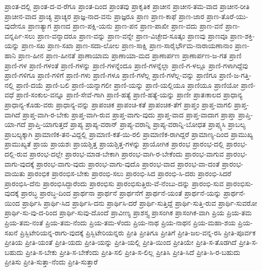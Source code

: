 {ಪ್ರಾಂತ-ದಲ್ಲಿ
ಪ್ರಾಂತ-ದ-ವ-ರೆಗೂ
ಪ್ರಾಂತ-ದಿಂದ
ಪ್ರಾಂತವು
ಪ್ರಾಕೃತಿಕ
ಪ್ರಾಚೀನ
ಪ್ರಾಚೀನ-ತಮ-ವಾದ
ಪ್ರಾಚೀನ-ರೀತಿ
ಪ್ರಾಚೀನ-ವಾದ
ಪ್ರಾಚ್ಯ
ಪ್ರಾಚ್ಯರ
ಪ್ರಾಜ್ಞ-ನಾದ-ವನು
ಪ್ರಾಜ್ಞರೂ
ಪ್ರಾಣ
ಪ್ರಾಣ-ಕಾಫೆ
ಪ್ರಾಣ-ಜಾರ
ಪ್ರಾಣ-ತೊರೆ-ಯು-ವುದೇನೂ
ಪ್ರಾಣತ್ಯಾಗ
ಪ್ರಾಣದ
ಪ್ರಾಣ-ಪಕ್ಷಿ-ಯನು
ಪ್ರಾಣ-ಪನ
ಪ್ರಾಣ-ಪಾಖೀ
ಪ್ರಾಣ-ವದು
ಪ್ರಾಣ-ವನೆ
ಪ್ರಾಣ-ವನ್ನರ್ಪಿ-ಸಲು
ಪ್ರಾಣ-ವನ್ನಾದರೂ
ಪ್ರಾಣ-ವನ್ನು
ಪ್ರಾಣ-ವನ್ನೇ
ಪ್ರಾಣ-ವಿಚ್ಛೇದ-ಸೂತ್ಕಂ
ಪ್ರಾಣವು
ಪ್ರಾಣವೂ
ಪ್ರಾಣ-ಶಕ್ತಿ-ಯನ್ನು
ಪ್ರಾಣ-ಸಖ
ಪ್ರಾಣ-ಸಖಾ
ಪ್ರಾಣ-ಸದಾ-ಲೋಲ
ಪ್ರಾಣ-ಸಾಕ್ಷಿ
ಪ್ರಾಣ-ಸಾರೈರ್ಭೌಮ-ನಾರಾಯಣಾನಾಂ
ಪ್ರಾಣ-ಹಾನಿ
ಪ್ರಾಣ-ಹೀನ
ಪ್ರಾಣ-ಹೀನತೆ
ಪ್ರಾಣಾಯಾಮ
ಪ್ರಾಣಾಯಾ-ಮದ
ಪ್ರಾಣಾರ್ಪಣ
ಪ್ರಾಣಾರ್ಪಣ-ಜ-ಗತ
ಪ್ರಾಣಿ
ಪ್ರಾಣಿ-ಗಳ
ಪ್ರಾಣಿ-ಗಳಂತೆ
ಪ್ರಾಣಿ-ಗಳನ್ನು
ಪ್ರಾಣಿ-ಗಳನ್ನೆಂದೂ
ಪ್ರಾಣಿ-ಗಳನ್ನೆಲ್ಲಾ
ಪ್ರಾಣಿ-ಗ-ಳಲ್ಲೂ
ಪ್ರಾಣಿ-ಗಳಾಗಿದ್ದೆವು
ಪ್ರಾಣಿ-ಗಳಿಗೂ
ಪ್ರಾಣಿ-ಗಳಿಗೆ
ಪ್ರಾಣಿ-ಗಳು
ಪ್ರಾಣಿ-ಗಳೂ
ಪ್ರಾಣಿ-ಗಳೆಲ್ಲ
ಪ್ರಾಣಿ-ಗಳೆಲ್ಲ-ವನ್ನು
ಪ್ರಾಣಿಗೂ
ಪ್ರಾಣಿ-ಜ-ಗತ್ತಿ-ನಲ್ಲಿ
ಪ್ರಾಣಿ-ದಯೆ
ಪ್ರಾಣಿ-ಬಲಿ
ಪ್ರಾಣಿ-ಯನ್ನಾಗಲೀ
ಪ್ರಾಣಿ-ಯನ್ನು
ಪ್ರಾಣಿ-ಯಲ್ಲಿಯೂ
ಪ್ರಾಣಿಯೂ
ಪ್ರಾಣಿಯೋ
ಪ್ರಾಣಿ-ವಧೆ
ಪ್ರಾಣಿ-ಸಂಕುಲ-ವನ್ನೂ
ಪ್ರಾಣಿ-ಸೇವೆ-ಗಾಗಿ
ಪ್ರಾಣಿ-ಹತ್ಯೆ
ಪ್ರಾಣಿ-ಹತ್ಯೆ-ಯನ್ನು
ಪ್ರಾಣೀ
ಪ್ರಾತಃಕಾಲದ
ಪ್ರಾಧಾನ್ಯ
ಪ್ರಾಧಾನ್ಯ-ಕೊಡು-ವರು
ಪ್ರಾಧಾನ್ಯ-ವನ್ನು
ಪ್ರಾಪಂಚಿಕ
ಪ್ರಾಪಂಚಿ-ಕತೆ
ಪ್ರಾಪಂಚಿಕ-ತೆಗೆ
ಪ್ರಾಪ್ತಂ
ಪ್ರಾಪ್ತ-ವಾಗಲಿ
ಪ್ರಾಪ್ತ-ವಾಗಿದೆ
ಪ್ರಾಪ್ತ-ವಾಗಿ-ರ-ಬೇಕು
ಪ್ರಾಪ್ತ-ವಾಗಿ-ರುವ
ಪ್ರಾಪ್ತ-ವಾಗು-ವುದು
ಪ್ರಾಪ್ತ-ವಾದ
ಪ್ರಾಪ್ತ-ವಾದಾಗ
ಪ್ರಾಪ್ತಾ
ಪ್ರಾಪ್ತಿ-ಯಾ-ಗದೆ
ಪ್ರಾಪ್ತಿ-ಯಾಗುತ್ತದೆ
ಪ್ರಾಪ್ಯ
ಪ್ರಾಪ್ಯ-ವರಾನ್
ಪ್ರಾಪ್ಯ-ವರಾನ್ನಿ
ಪ್ರಾಪ್ಯ-ವರಾನ್ನಿ-ಬೋಧತ
ಪ್ರಾಪ್ಸ್ಯಸಿ
ಪ್ರಾಬಲ್ಯ
ಪ್ರಾಬಲ್ಯಕ್ಕಾಗಿ
ಪ್ರಾಮಾಣಿಕ-ತನ-ವಿದ್ದಲ್ಲಿ
ಪ್ರಾಮಾಣಿ-ಕತೆ-ಯಿ-ರಲಿ
ಪ್ರಾಮಾಣಿಕ-ರಾಗಿದ್ದರೆ
ಪ್ರಾಮಾಣ್ಯ-ದಿಂದ
ಪ್ರಾಮುಖ್ಯ
ಪ್ರಾಮುಖ್ಯತೆ
ಪ್ರಾಯ
ಪ್ರಾಯಶಃ
ಪ್ರಾಯಶ್ಚಿತ್ತ
ಪ್ರಾಯಶ್ಚಿತ್ತ-ಗಳನ್ನು
ಪ್ರಾಯೋಗಿಕ
ಪ್ರಾರಂಭ
ಪ್ರಾರಂಭ-ದಲ್ಲಿ
ಪ್ರಾರಂಭ-ದಲ್ಲಿ-ರುವ
ಪ್ರಾರಂಭ-ದಲ್ಲೇ
ಪ್ರಾರಂಭ-ಮಾಡ-ಬೇಕಾಗಿ
ಪ್ರಾರಂಭ-ವಾಗಿ-ರ-ಬೇಕೆಂದು
ಪ್ರಾರಂಭ-ವಾಗುವ
ಪ್ರಾರಂಭ-ವಾಗು-ವುದಕ್ಕೆ
ಪ್ರಾರಂಭ-ವಾಗು-ವುದು
ಪ್ರಾರಂಭ-ವಾಗು-ವುದೊ
ಪ್ರಾರಂಭ-ವಾದ
ಪ್ರಾರಂಭ-ವಾ-ದಂತೆ
ಪ್ರಾರಂಭ-ವಾಯಿತು
ಪ್ರಾರಂಭಿಕ
ಪ್ರಾರಂಭಿಸ-ಬೇಕು
ಪ್ರಾರಂಭಿ-ಸಲು
ಪ್ರಾರಂಭಿ-ಸಿದ
ಪ್ರಾರಂಭಿ-ಸಿ-ದರು
ಪ್ರಾರಂಭಿ-ಸಿದರೆ
ಪ್ರಾರಂಭಿಸಿ-ದೆನು
ಪ್ರಾರಂಭಿಸಿದ್ದಾರೆಂದು
ಪ್ರಾರಂಭಿಸು
ಪ್ರಾರಂಭಿಸುತ್ತಿರು-ವೆ-ನೆಂಬು-ದನ್ನು
ಪ್ರಾರಂಭಿ-ಸುವ
ಪ್ರಾರಂಭಿಸು-ವುದಕ್ಕೆ
ಪ್ರಾರಬ್ಧ
ಪ್ರಾರಬ್ಧ-ದಿಂದ
ಪ್ರಾರ್ಥನಾ
ಪ್ರಾರ್ಥನೆ
ಪ್ರಾರ್ಥನೆಗೆ
ಪ್ರಾರ್ಥನೆ-ಯಂತೆ
ಪ್ರಾರ್ಥನೆ-ಯನ್ನು
ಪ್ರಾರ್ಥನೆ-ಯಿಂದ
ಪ್ರಾರ್ಥಿಸಿ
ಪ್ರಾರ್ಥಿ-ಸಿದ
ಪ್ರಾರ್ಥಿಸಿ-ದನು
ಪ್ರಾರ್ಥಿಸಿ-ದರೆ
ಪ್ರಾರ್ಥಿ-ಸುತ್ತಿದ್ದೆ
ಪ್ರಾರ್ಥಿ-ಸುತ್ತಿ-ರುವ
ಪ್ರಾರ್ಥಿ-ಸುವರೋ
ಪ್ರಾರ್ಥಿ-ಸು-ವು-ದ-ರಿಂದ
ಪ್ರಾರ್ಥಿ-ಸುವು-ದೊಂದೆ
ಪ್ರಾವೀಣ್ಯ
ಪ್ರಾಶಸ್ತ್ಯ
ಪ್ರಾಸಂಗಿಕ
ಪ್ರಾಸಂಗಿಕ-ವಾಗಿ
ಪ್ರಿಯ
ಪ್ರಿಯ-ತಮ
ಪ್ರಿಯ-ತಮ-ನಂತೆ
ಪ್ರಿಯ-ತಮ-ನೆಂದು
ಪ್ರಿಯ-ತಮ-ಳೆಂದು
ಪ್ರಿಯ-ನಾಥ
ಪ್ರಿಯ-ನಾಥನ
ಪ್ರಿಯ-ಮಹಾ-ಶಯ
ಪ್ರಿಯ-ಸಖನೆ
ಪ್ರಿಸ್ಬಿಟೇರಿಯನ್ನ-ರಾಗು-ವುದಕ್ಕೆ
ಪ್ರಿಸ್ಬಿಟೇರಿಯನ್ನರು
ಪ್ರೀತಿ
ಪ್ರೀತಿಗೂ
ಪ್ರೀತಿಗೆ
ಪ್ರೀತಿ-ಜಲ-ವನ್ನ-ರಸಿ
ಪ್ರೀತಿ-ಪೂರ್ವಕ
ಪ್ರೀತಿಯ
ಪ್ರೀತಿ-ಯಂತೆ
ಪ್ರೀತಿ-ಯದು
ಪ್ರೀತಿ-ಯನ್ನು
ಪ್ರೀತಿ-ಯಲ್ಲಿ
ಪ್ರೀತಿ-ಯಿಂದ
ಪ್ರೀತಿಯೇ
ಪ್ರೀತಿ-ಸ-ತೊಡಗಿದೆ
ಪ್ರೀತಿ-ಸ-ಬಹುದು
ಪ್ರೀತಿ-ಸ-ಬೇಕು
ಪ್ರೀತಿ-ಸ-ಬೇಕೆಂದು
ಪ್ರೀತಿ-ಸಲಿ
ಪ್ರೀತಿ-ಸ-ಲಿಲ್ಲ
ಪ್ರೀತಿಸಿ
ಪ್ರೀತಿ-ಸಿದೆ
ಪ್ರೀತಿ-ಸಿ-ರ-ಬಹುದು
ಪ್ರೀತಿಸು
ಪ್ರೀತಿ-ಸುತ್ತಾ-ನೆಂದು
ಪ್ರೀತಿ-ಸುತ್ತಾರೆ
}
